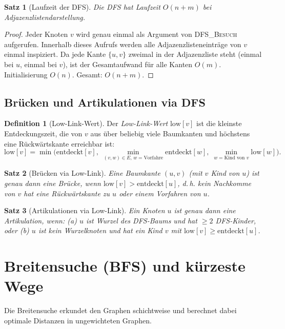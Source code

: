 ﻿\documentclass[a4paper,12pt,openany,oneside]{book}
\theoremstyle{definition}
\newtheorem{definition}{Definition}[chapter]
\theoremstyle{plain}
\newtheorem{satz}{Satz}[chapter]
\theoremstyle{remark}
\begin{document}
\begin{satz}[Laufzeit der DFS]
  Die DFS hat Laufzeit $O(n+m)$ bei Adjazenzlistendarstellung.
\end{satz}

\begin{proof}
  Jeder Knoten $v$ wird genau einmal als Argument von \textsc{DFS\_Besuch}
  aufgerufen. Innerhalb dieses Aufrufs werden alle Adjazenzlisteneintr\"age
  von $v$ einmal inspiziert. Da jede Kante $\{u,v\}$ zweimal in der
  Adjazenzliste steht (einmal bei $u$, einmal bei $v$), ist der
  Gesamtaufwand f\"ur alle Kanten $O(m)$. Initialisierung $O(n)$.
  Gesamt: $O(n+m)$.
\end{proof}

\subsection{Br\"ucken und Artikulationen via DFS}

\begin{definition}[Low-Link-Wert]
  Der \emph{Low-Link-Wert} $\mathrm{low}[v]$ ist die kleinste
  Entdeckungszeit, die von $v$ aus \"uber beliebig viele Baumkanten
  und h\"ochstens eine R\"uckw\"artskante erreichbar ist:
  \[
    \mathrm{low}[v] = \min\bigl(\mathrm{entdeckt}[v],\;
    \min_{(v,w) \in E,\, w = \text{Vorfahre}} \mathrm{entdeckt}[w],\;
    \min_{w = \text{Kind von } v} \mathrm{low}[w]\bigr).
  \]
\end{definition}

\begin{satz}[Br\"ucken via Low-Link]
  Eine Baumkante $(u,v)$ (mit $v$ Kind von $u$) ist genau dann eine
  Br\"ucke, wenn $\mathrm{low}[v] > \mathrm{entdeckt}[u]$, d.\,h. kein
  Nachkomme von $v$ hat eine R\"uckw\"artskante zu $u$ oder einem Vorfahren
  von $u$.
\end{satz}

\begin{satz}[Artikulationen via Low-Link]
  Ein Knoten $u$ ist genau dann eine Artikulation, wenn:
  (a) $u$ ist Wurzel des DFS-Baums und hat $\geq 2$ DFS-Kinder, oder
  (b) $u$ ist kein Wurzelknoten und hat ein Kind $v$ mit
  $\mathrm{low}[v] \geq \mathrm{entdeckt}[u]$.
\end{satz}

\section{Breitensuche (BFS) und k\"urzeste Wege}

Die Breitensuche erkundet den Graphen schichtweise und berechnet dabei
optimale Distanzen in ungewichteten Graphen.
\end{document}
